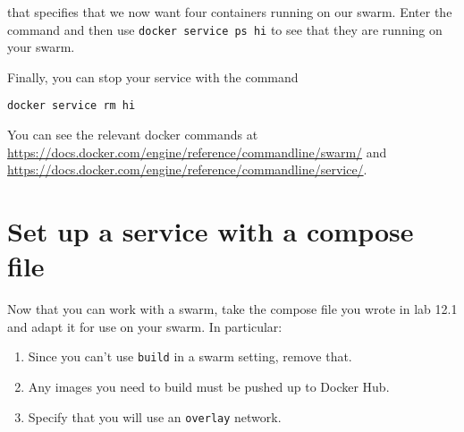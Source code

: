\documentclass{article}
\begin{document}
that specifies that we now want four containers running on our swarm. Enter the command and then use \texttt{docker service ps hi} to see that they are running on your swarm.

Finally, you can stop your service with the command

\texttt{docker service rm hi}

You can see the relevant docker commands at \url{https://docs.docker.com/engine/reference/commandline/swarm/} and \url{https://docs.docker.com/engine/reference/commandline/service/}. 

\section{Set up a service with a compose file}
Now that you can work with a swarm, take the compose file you wrote in lab 12.1 and adapt it for use on your swarm. In particular:

\begin{enumerate}
  \item Since you can't use \texttt{build} in a swarm setting, remove that.
  \item Any images you need to build must be pushed up to Docker Hub.
  \item Specify that you will use an \texttt{overlay} network.
\end{enumerate}
\end{document}
